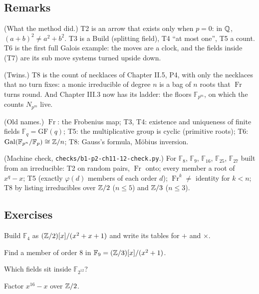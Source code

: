 \subsection*{Remarks}

\begin{lines}
\item[\lab{R1}] (What the method did.) T2 is an arrow that exists only when $p = 0$: in $\mathbb{Q}$, $(a + b)^2 \ne a^2 + b^2$. T3 is a Build (splitting field), T4 ``at most one'', T5 a count. T6 is the first full Galois example: the moves are a clock, and the fields inside (T7) are its sub move systems turned upside down.
\item[\lab{R2}] (Twins.) T8 is the count of necklaces of Chapter II.5, P4, with only the necklaces that no turn fixes: a monic irreducible of degree $n$ is a bag of $n$ roots that $\operatorname{Fr}$ turns round. And Chapter III.3 now has its ladder: the floors $\mathbb{F}_{p^m}$, on which the counts $N_{p^m}$ live.
\item[\lab{R3}] (Old names.) $\operatorname{Fr}$: the Frobenius map; T3, T4: existence and uniqueness of finite fields $\mathbb{F}_q = \mathrm{GF}(q)$; T5: the multiplicative group is cyclic (primitive roots); T6: $\operatorname{Gal}(\mathbb{F}_{p^n}/\mathbb{F}_p) \cong \mathbb{Z}/n$; T8: Gauss's formula, Möbius inversion.
\item[\lab{R4}] (Machine check, \texttt{checks/b1-p2-ch11-12-check.py}.) For $\mathbb{F}_8$, $\mathbb{F}_9$, $\mathbb{F}_{16}$, $\mathbb{F}_{25}$, $\mathbb{F}_{27}$ built from an irreducible: T2 on random pairs, $\operatorname{Fr}$ onto; every member a root of $x^q - x$; T5 (exactly $\varphi(d)$ members of each order $d$); $\operatorname{Fr}^k \ne$ identity for $k < n$; T8 by listing irreducibles over $\mathbb{Z}/2$ ($n \le 5$) and $\mathbb{Z}/3$ ($n \le 3$).
\end{lines}

\subsection*{Exercises}

\begin{lines}
\item[\lab{E1}] Build $\mathbb{F}_4$ as $(\mathbb{Z}/2)[x]/(x^2 + x + 1)$ and write its tables for $+$ and $\times$.
\item[\lab{E2}] Find a member of order $8$ in $\mathbb{F}_9 = (\mathbb{Z}/3)[x]/(x^2 + 1)$.
\item[\lab{E3}] Which fields sit inside $\mathbb{F}_{2^{12}}$?
\item[\lab{E4}] Factor $x^{16} - x$ over $\mathbb{Z}/2$.
\end{lines}

